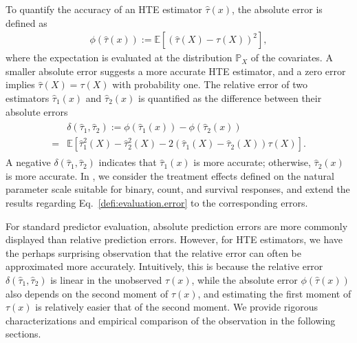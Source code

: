 \documentclass[twoside]{article}
\newcommand{\1}{{\mathbbm{1}}}
\def\EE{\mathbb{E}}
\def\PP{\mathbb{P}}
\begin{document}
To quantify the accuracy of an HTE estimator $\hat{\tau}(x)$, the absolute error is defined as
\begin{align}\label{defi:evaluation.error}
    \phi(\hat{\tau}(x))
    := \EE\left[(\hat{\tau}(X) - \tau(X))^2\right],
\end{align}
where the expectation is evaluated at the distribution $\PP_X$ of the covariates. 
A smaller absolute error suggests a more accurate HTE estimator, and a zero error implies $\hat{\tau}(X) = {\tau}(X)$ with probability one.
The relative error of two estimators $\hat{\tau}_1(x)$ and $\hat{\tau}_2(x)$ is quantified as the difference between their absolute errors 
\begin{align}\label{defi:evaluation.error.relative}
\begin{split}    
    &\delta(\hat{\tau}_1, \hat{\tau}_2)
    := \phi(\hat{\tau}_1(x)) - \phi(\hat{\tau}_2(x))  \\
    =& \EE\left[\hat{\tau}_1^2(X) - \hat{\tau}_2^2(X) - 2(\hat{\tau}_1(X) - \hat{\tau}_2(X)) \tau(X) \right].
\end{split}
\end{align}  
A negative $\delta(\hat{\tau}_1, \hat{\tau}_2)$ indicates that $\hat{\tau}_1(x)$ is more accurate; otherwise, $\hat{\tau}_2(x)$ is more accurate.
In , we consider the treatment effects defined on the natural parameter scale suitable for binary, count, and survival responses, and extend the results regarding Eq.~\eqref{defi:evaluation.error} to the corresponding errors.


For standard predictor evaluation, absolute prediction errors are more commonly displayed than relative prediction errors.
However, for HTE estimators, we have the perhaps surprising observation that the relative error can often be approximated more accurately.
Intuitively, this is because the relative error $ \delta(\hat{\tau}_1, \hat{\tau}_2)$ is linear in the unobserved $\tau(x)$, while the absolute error $\phi(\hat{\tau}(x))$ also depends on the second moment of $\tau(x)$, and estimating the first moment of $\tau(x)$ is relatively easier that of the second moment. 
We provide rigorous characterizations and empirical comparison of the observation in the following sections.
\end{document}
